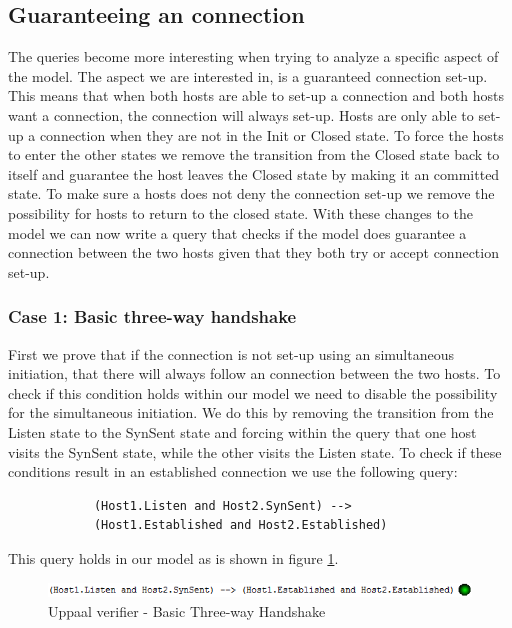 \documentclass[twocolumn]{article}
\begin{document}
	\subsection{Guaranteeing an connection} %
	\label{sub:guaranteeing_an_connection}
		The queries become more interesting when trying to analyze a specific aspect of the model. The aspect we are interested in, is a guaranteed connection set-up. This means that when both hosts are able to set-up a connection and both hosts want a connection, the connection will always set-up. Hosts are only able to set-up a connection when they are not in the Init or Closed state. To force the hosts to enter the other states we remove the transition from the Closed state back to itself and guarantee the host leaves the Closed state by making it an committed state. To make sure a hosts does not deny the connection set-up we remove the possibility for hosts to return to the closed state. With these changes to the model we can now write a query that checks if the model does guarantee a connection between the two hosts given that they both try or accept connection set-up.

		\subsubsection{Case 1: Basic three-way handshake}
		First we prove that if the connection is not set-up using an simultaneous initiation, that there will always follow an connection between the two hosts. To check if this condition holds within our model we need to disable the possibility for the simultaneous initiation. We do this by removing the transition from the Listen state to the SynSent state and forcing within the query that one host visits the SynSent state, while the other visits the Listen state. To check if these conditions result in an established connection we use the following query:
		\begin{verbatim}
			(Host1.Listen and Host2.SynSent) -->
			(Host1.Established and Host2.Established)
		\end{verbatim}
		This query holds in our model as is shown in figure \ref{fig:verifier2}.
		\begin{figure}[h!]
			\begin{center}
				\includegraphics[width=\linewidth]{verifier-listen.png}
			\end{center}
			\caption{Uppaal verifier - Basic Three-way Handshake}
			\label{fig:verifier2}
		\end{figure}
		
\end{document}
